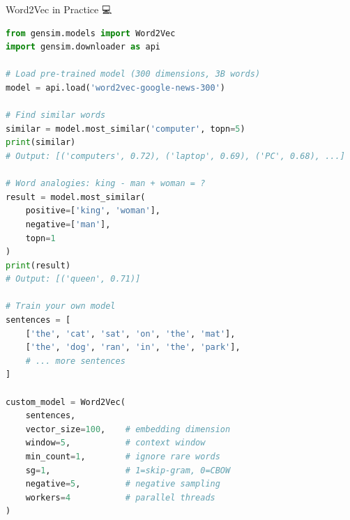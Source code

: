 \documentclass[aspectratio=169]{beamer}
\begin{document}
\begin{frame}[fragile]{Word2Vec in Practice 💻}
\begin{lstlisting}[language=Python]
from gensim.models import Word2Vec
import gensim.downloader as api

# Load pre-trained model (300 dimensions, 3B words)
model = api.load('word2vec-google-news-300')

# Find similar words
similar = model.most_similar('computer', topn=5)
print(similar)
# Output: [('computers', 0.72), ('laptop', 0.69), ('PC', 0.68), ...]

# Word analogies: king - man + woman = ?
result = model.most_similar(
    positive=['king', 'woman'],
    negative=['man'],
    topn=1
)
print(result)
# Output: [('queen', 0.71)]

# Train your own model
sentences = [
    ['the', 'cat', 'sat', 'on', 'the', 'mat'],
    ['the', 'dog', 'ran', 'in', 'the', 'park'],
    # ... more sentences
]

custom_model = Word2Vec(
    sentences,
    vector_size=100,    # embedding dimension
    window=5,           # context window
    min_count=1,        # ignore rare words
    sg=1,               # 1=skip-gram, 0=CBOW
    negative=5,         # negative sampling
    workers=4           # parallel threads
)
\end{lstlisting}
\end{frame}
\end{document}
